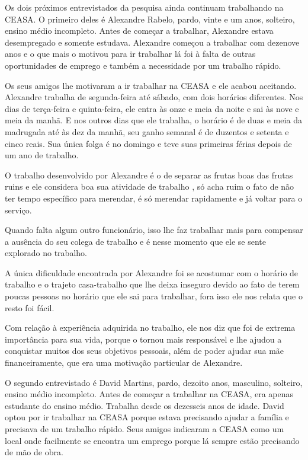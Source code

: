 Os dois próximos entrevistados da pesquisa ainda continuam trabalhando na CEASA. O primeiro deles é Alexandre Rabelo, pardo, vinte e um anos, solteiro, ensino médio incompleto. Antes de começar a trabalhar, Alexandre estava desempregado e somente estudava. Alexandre começou a trabalhar com dezenove anos e o que mais o motivou para ir trabalhar lá foi à falta de outras oportunidades de emprego e também a necessidade por um trabalho rápido.

Os seus amigos lhe motivaram a ir trabalhar na CEASA e ele acabou aceitando. Alexandre trabalha de segunda-feira até sábado, com dois horários diferentes. Nos dias de terça-feira e quinta-feira, ele entra às onze e meia da noite e sai às nove e meia da manhã. E nos outros dias que ele trabalha, o horário é de duas e meia da madrugada até às dez da manhã, seu ganho semanal é de duzentos e setenta e cinco reais. Sua única folga é no domingo e teve suas primeiras férias depois de um ano de trabalho.

O trabalho desenvolvido por Alexandre é o de separar as frutas boas das frutas ruins e ele considera boa sua atividade de trabalho , só acha ruim o fato de não ter tempo específico para merendar, é só merendar rapidamente e já voltar para o serviço.

Quando falta algum outro funcionário, isso lhe faz trabalhar mais para compensar a ausência do seu colega de trabalho e é nesse momento que ele se sente explorado no trabalho.

A única dificuldade encontrada por Alexandre foi se acostumar com o horário de trabalho e o trajeto casa-trabalho que lhe deixa inseguro devido ao fato de terem poucas pessoas no horário que ele sai para trabalhar, fora isso ele nos relata que o resto foi fácil.

Com relação à experiência adquirida no trabalho, ele nos diz que foi de extrema importância para sua vida, porque o tornou mais responsável e lhe ajudou a conquistar muitos dos seus objetivos pessoais, além de poder ajudar sua mãe financeiramente, que era uma motivação particular de Alexandre.

O segundo entrevistado é David Martins, pardo, dezoito anos, masculino, solteiro, ensino médio incompleto. Antes de começar a trabalhar na CEASA, era apenas estudante do ensino médio. Trabalha desde os dezesseis anos de idade. David optou por ir trabalhar na CEASA porque estava precisando ajudar a família e precisava de um trabalho rápido. Seus amigos indicaram a CEASA como um local onde facilmente se encontra um emprego porque lá sempre estão precisando de mão de obra.

